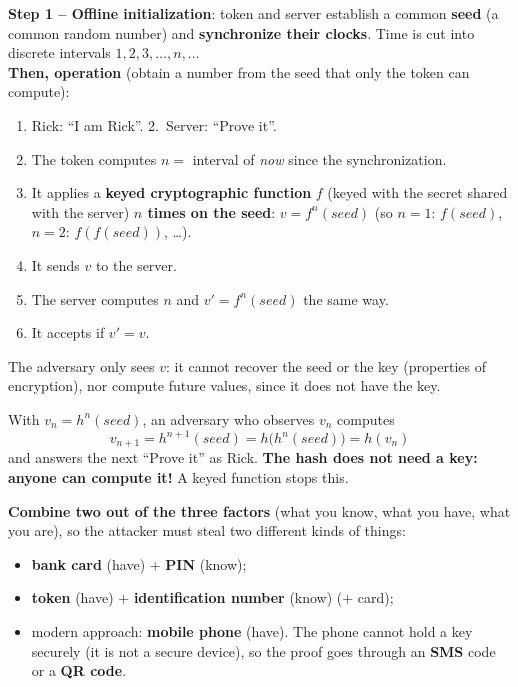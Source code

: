 \begin{defnbox}[title=Time-based tokens: how they work]
\textbf{Step 1 -- Offline initialization}: token and server establish a common \textbf{seed} (a
common random number) and \textbf{synchronize their clocks}. Time is cut into discrete intervals
$1, 2, 3, \ldots, n, \ldots$ \\
\textbf{Then, operation} (obtain a number from the seed that only the token can compute):
\begin{enumerate}
  \item Rick: ``I am Rick''. 2.~Server: ``Prove it''.
  \setcounter{enumi}{2}
  \item The token computes $n = $ interval of \emph{now} since the synchronization.
  \item It applies a \textbf{keyed cryptographic function} $f$ (keyed with the secret shared with
        the server) \textbf{$n$ times on the seed}: $v = f^n(\mathit{seed})$ (so $n=1$:
        $f(\mathit{seed})$, $n=2$: $f(f(\mathit{seed}))$, \ldots).
  \item It sends $v$ to the server.
  \item The server computes $n$ and $v' = f^n(\mathit{seed})$ the same way.
  \item It accepts if $v' = v$.
\end{enumerate}
The adversary only sees $v$: it cannot recover the seed or the key (properties of encryption),
nor compute future values, since it does not have the key.
\end{defnbox}

\begin{warnbox}[title={Why the function cannot be a hash}]
With $v_n = h^n(\mathit{seed})$, an adversary who observes $v_n$ computes
\[
  v_{n+1} = h^{n+1}(\mathit{seed}) = h\big(h^n(\mathit{seed})\big) = h(v_n)
\]
and answers the next ``Prove it'' as Rick. \textbf{The hash does not need a key: anyone can compute
it!} A keyed function stops this.
\end{warnbox}

\begin{defnbox}[title={2FA: two-factor authentication}]
\textbf{Combine two out of the three factors} (what you know, what you have, what you are), so the
attacker must steal two different kinds of things:
\begin{itemize}
  \item \textbf{bank card} (have) + \textbf{PIN} (know);
  \item \textbf{token} (have) + \textbf{identification number} (know) (+ card);
  \item modern approach: \textbf{mobile phone} (have). The phone cannot hold a key securely (it is
        not a secure device), so the proof goes through an \textbf{SMS} code or a \textbf{QR
        code}.
\end{itemize}
\end{defnbox}


